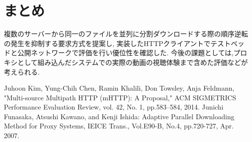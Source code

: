 \documentclass{ltjsarticle}
\begin{document}
\section{まとめ}
\vspace{-2mm}
複数のサーバーから同一のファイルを並列に分割ダウンロードする際の順序逆転の発生を抑制する要求方式を提案し,
実装したHTTPクライアントでテストベッドと公開ネットワークで評価を行い優位性を確認した.
今後の課題としては,プロキシとして組み込んだシステムでの実際の動画の視聴体験まで含めた評価などが考えられる.
\vspace{-5mm}
\small
\begin{thebibliography}{2}
\vspace{-2mm}
\small{
Juhoon Kim, Yung-Chih Chen, Ramin Khalili, Don Towsley, Anja Feldmann,
"Multi-source Multipath HTTP (mHTTP): A Proposal,"
ACM SIGMETRICS Performance Evaluation Review, vol. 42, No. 1, pp.583--584, 2014.
\small
Junichi Funasaka, Atsushi Kawano, and Kenji Ishida: Adaptive Parallel Downloading Method for Proxy Systems, IEICE Trans., Vol.E90-B, No.4, pp.720-727, Apr. 2007.}
\end{thebibliography}
\end{document}
